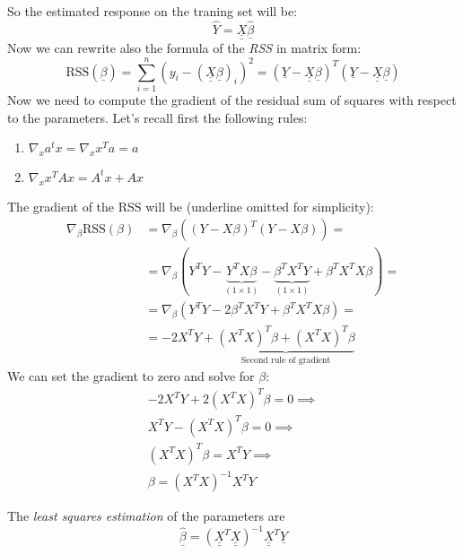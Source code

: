 So the estimated response on the traning set will be:
\[
    \hat{Y} = \underline{\underline{X}} \underline{\hat{\beta}}
\]
Now we can rewrite also the formula of the \textit{RSS} in matrix form:
\[
    \text{RSS}(\underline{\beta})  = \sum_{i=1}^{n} \left(y_i - (\underline{\underline{X}} \underline{\beta})_i\right)^2 = (\underline{Y} - \underline{\underline{X}} \underline{\beta})^T(\underline{Y} - \underline{\underline{X}} \underline{\beta})
\]
Now we need to compute the gradient of the residual sum of squares with respect to the parameters. Let's recall first the following rules:
\begin{enumerate}
    \item $\nabla_x a^t x = \nabla_x x^T a =  a$
    \item $\nabla_x x^T A x = A^t x + A x$
\end{enumerate}
The gradient of the RSS will be (underline omitted for simplicity):
\begin{align*}
    \nabla_\beta \text{RSS} (\beta) & = \nabla_\beta \left((Y- X\beta)^T (Y-X\beta) \right) =                                 \\
                                    & = \nabla_\beta \left(Y^T Y - \underbrace{Y^T X\beta}_{(1\times 1)} - \underbrace{\beta^T X^T Y}_{(1\times 1)} + \beta^T X^T X \beta \right) = \\
                                    & = \nabla_\beta\left(Y^T Y - 2 \beta^T X^T Y + \beta^T X^T X \beta\right) =              \\
                                    & = -2 X^T Y + \underbrace{(X^T X)^T \beta + (X^T X)^T \beta}_{\text{Second rule of gradient}} 
\end{align*}
We can set the gradient to zero and solve for $\beta$:
\begin{align*}
    -2 X^T Y + 2(X^T X)^T \beta = 0 \implies \\
    X^T Y - (X^T X)^T \beta = 0 \implies \\
    (X^T X)^T \beta = X^T Y \implies \\
    \beta = (X^T X)^{-1} X^T Y    
\end{align*}


The \textit{least squares estimation} of the parameters are
\[
    \hat{\underline\beta} = (\underline {\underline X}^T \underline{\underline X} )^{-1} \underline{\underline X}^T \underline Y
\]

